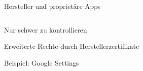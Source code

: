 \begin{frame}
	\centering
	Hersteller und proprietäre Apps
	\begin{columns}[T] %
    	\begin{column}[T]{5cm} %
    		\begin{block}{}
				Nur schwer zu kontrollieren
			\end{block}
			\begin{block}{}
				Erweiterte Rechte durch Herstellerzertifikate
			\end{block}
			\begin{block}{}
				Beispiel: Google Settings
			\end{block}
    	\end{column}
	\end{columns}

\end{frame}